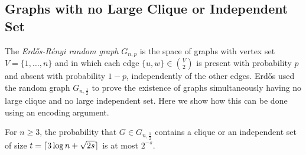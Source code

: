 \documentclass{patmorin}
\begin{document}
\subsection{Graphs with no Large Clique or Independent Set}

The \emph{Erd\H{o}s-R\'enyi random graph} $G_{n,p}$ is the space of
graphs with vertex set $V=\{1,\ldots,n\}$ and in which each edge $\{u,
w\} \in \binom{V}{2}$ is present with probability $p$ and absent with
probability $1-p$, independently of the other edges.  Erd\H{o}s
\cite{erdos:some} used the random graph $G_{n,\frac{1}{2}}$ to prove
the existence of graphs simultaneously having no large clique and no large
independent set. Here we show how this can be done using an encoding
argument.

\begin{thm}
  For $n \ge 3$, the probability that $G \in G_{n,\frac{1}{2}}$
  contains a clique or an independent set of size $t = {\lceil 3\log n +
    \sqrt{2s} \rceil}$ is at most $2^{-s}$.
\end{thm}
\end{document}
